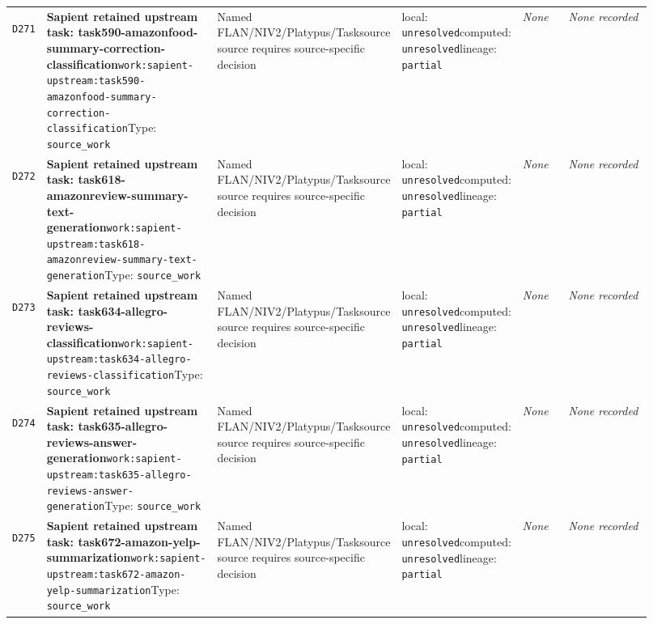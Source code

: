 \documentclass[9pt,a4paper]{article}
\newcommand{\depid}[1]{\hypertarget{dep:#1}{\texttt{#1}}}
\begin{document}
\begin{landscape}
\begin{longtable}{@{}L{0.035\linewidth}L{0.185\linewidth}L{0.27\linewidth}L{0.09\linewidth}L{0.10\linewidth}L{0.24\linewidth}@{}}
\depid{D271} & \textbf{Sapient retained upstream task: task590-amazonfood-summary-correction-classification}\newline \nolinkurl{work:sapient-upstream:task590-amazonfood-summary-correction-classification}\newline Type: \texttt{source\_work} & Named FLAN/NIV2/Platypus/Tasksource source requires source-specific decision & local: \texttt{unresolved}\newline computed: \texttt{unresolved}\newline lineage: \texttt{partial} & \textit{None} & \textit{None recorded} \\
\depid{D272} & \textbf{Sapient retained upstream task: task618-amazonreview-summary-text-generation}\newline \nolinkurl{work:sapient-upstream:task618-amazonreview-summary-text-generation}\newline Type: \texttt{source\_work} & Named FLAN/NIV2/Platypus/Tasksource source requires source-specific decision & local: \texttt{unresolved}\newline computed: \texttt{unresolved}\newline lineage: \texttt{partial} & \textit{None} & \textit{None recorded} \\
\depid{D273} & \textbf{Sapient retained upstream task: task634-allegro-reviews-classification}\newline \nolinkurl{work:sapient-upstream:task634-allegro-reviews-classification}\newline Type: \texttt{source\_work} & Named FLAN/NIV2/Platypus/Tasksource source requires source-specific decision & local: \texttt{unresolved}\newline computed: \texttt{unresolved}\newline lineage: \texttt{partial} & \textit{None} & \textit{None recorded} \\
\depid{D274} & \textbf{Sapient retained upstream task: task635-allegro-reviews-answer-generation}\newline \nolinkurl{work:sapient-upstream:task635-allegro-reviews-answer-generation}\newline Type: \texttt{source\_work} & Named FLAN/NIV2/Platypus/Tasksource source requires source-specific decision & local: \texttt{unresolved}\newline computed: \texttt{unresolved}\newline lineage: \texttt{partial} & \textit{None} & \textit{None recorded} \\
\depid{D275} & \textbf{Sapient retained upstream task: task672-amazon-yelp-summarization}\newline \nolinkurl{work:sapient-upstream:task672-amazon-yelp-summarization}\newline Type: \texttt{source\_work} & Named FLAN/NIV2/Platypus/Tasksource source requires source-specific decision & local: \texttt{unresolved}\newline computed: \texttt{unresolved}\newline lineage: \texttt{partial} & \textit{None} & \textit{None recorded} \\

\end{longtable}
\end{landscape}
\end{document}
